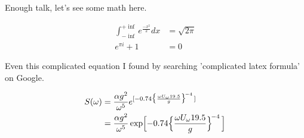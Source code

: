 \documentclass[12pt]{article}
\begin{document}
Enough talk, let's see some math here.

\begin{align*}
	\int_{-\inf}^{+\inf} e^{\frac{-x^2}{2}} dx &= \sqrt{2\pi} \\
	e^{\pi i} + 1 &= 0
\end{align*}

Even this complicated equation I found by searching 'complicated latex
formula' on Google.

\begin{align*}
	S(\omega)
	&= \frac{\alpha g^2}{\omega^5} e^{[ -0.74\bigl\{\frac{\omega U_\omega 19.5}{g}\bigr\}^{\!-4}\,]} \\
	&= \frac{\alpha g^2}{\omega^5} \exp\Bigl[ -0.74\Bigl\{\frac{\omega U_\omega 19.5}{g}\Bigr\}^{\!-4}\,\Bigr] 
\end{align*}
\end{document}
